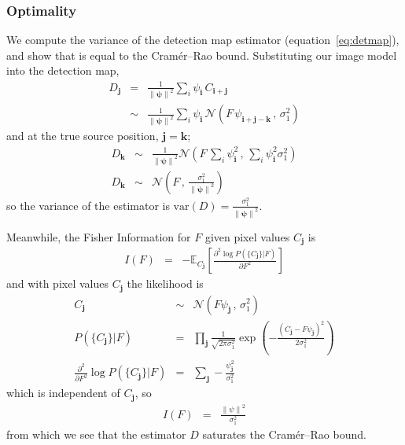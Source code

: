 \documentclass[letterpaper,preprint]{aastex62}
\newcommand{\equationname}{equation}
\newcommand{\eqnref}[1]{\mbox{\equationname~\ref{#1}}}
\newcommand{\var}[1]{\mathrm{Var}({#1})}
\newcommand{\drawnfrom}{\sim}
\newcommand{\gaussianN}{\mathcal{N}}
\newcommand{\gaussx}[2]{\gaussianN\!\left(#1 \, , \, #2\right)}
\newcommand{\psf}{\psi}
\newcommand{\psfat}[1]{\psf_{#1}}
\newcommand{\psfnorm}{\norm{\bm{\psf}}}
\newcommand{\norm}[1]{\left\lVert #1 \right\rVert}
\renewcommand{\var}[1]{\mathrm{var}\left( #1 \right)}
\renewcommand{\vec}[1]{\boldsymbol{#1}}
\newcommand{\ivec}{\vec{i}}
\newcommand{\jvec}{\vec{j}}
\newcommand{\kvec}{\vec{k}}
\begin{document}
\subsubsection{Optimality}

We compute the variance of the detection map estimator
(\eqnref{eq:detmap}), and show that is equal to the Cram\'er--Rao
bound.  Substituting our image model into the detection map,
\begin{eqnarray}
D_{\jvec} &=& \frac{1}{\psfnorm^2} \sum_{i} \psfat{\ivec} \,
C_{\ivec + \jvec}
\\
& \drawnfrom & \frac{1}{\psfnorm^2} \sum_{i} \psfat{\ivec} \,
\gaussx{F \, \psfat{\ivec + \jvec - \kvec}}{\sigma_1^2}
\end{eqnarray}
and at the true source position, $\jvec = \kvec$;
\begin{eqnarray}
%
D_{\kvec} &\drawnfrom& \frac{1}{\psfnorm^2} \gaussx%
{F \, \sum_{i} \psfat{\ivec}^2}%
{\sum_{i} \psfat{\ivec}^2 \sigma_1^2}
\\
D_{\kvec} &\drawnfrom& \gaussx%
{F}{\frac{\sigma_1^2}{\psfnorm^2}}
\end{eqnarray}
so the variance of the estimator is $\var{D} = \frac{\sigma_1^2}{\psfnorm^2}$.

Meanwhile, the Fisher Information for $F$ given pixel values $C_{\jvec}$ is
\begin{eqnarray}
  I(F) &=& -\mathbb{E}_{C_{\jvec}} \left[ \frac{\partial^2 \log P(\{ C_{\jvec} \} | F)}{\partial F^2} \right]
\end{eqnarray}
and with pixel values $C_{\jvec}$ the likelihood is
\begin{eqnarray}
  C_{\jvec} &\drawnfrom& \gaussx{F \psf_{\jvec}}{\sigma_1^2} \\
  P(\{ C_{\jvec} \} | F) &=& \prod_{\jvec} \frac{1}{\sqrt{2 \pi \sigma_1^2}} \exp \left( -\frac{(C_{\jvec} - F \psf_{\jvec})^2}{2 \sigma_1^2} \right) \\
  \frac{\partial^2}{\partial F^2} \log P(\{ C_{\jvec} \} | F) &=& \sum_{\jvec} -\frac{\psf_{\jvec}^2}{\sigma_1^2}
\end{eqnarray}
which is independent of $C_{\jvec}$, so
\begin{eqnarray}
  I(F) &=& \frac{\norm{\psf}^2}{\sigma_1^2}
\end{eqnarray}
from which we see that the estimator $D$ saturates the Cram\'er--Rao bound.
\end{document}
